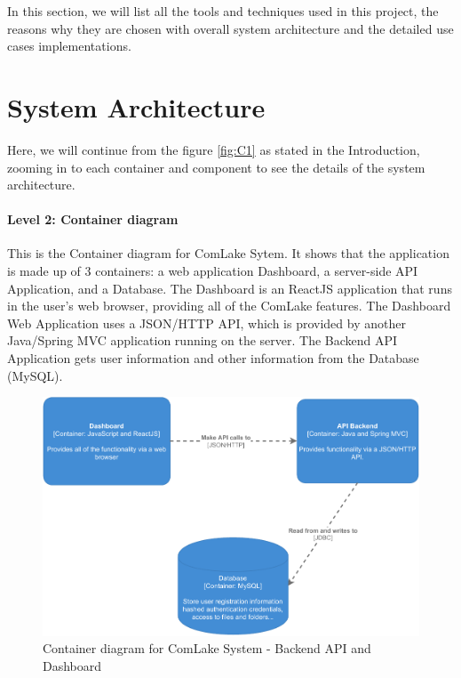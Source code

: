 In this section, we will list all the tools and techniques used in this project, the reasons why they are chosen with overall system architecture and the detailed use cases implementations.

\section{System Architecture}
Here, we will continue from the figure \ref{fig:C1} as stated in the Introduction, zooming in to each container and component to see the details of the system architecture.

\paragraph{Level 2: Container diagram}

This is the Container diagram for ComLake Sytem. It shows that the application is made up of 3 containers: a web application Dashboard, a server-side API Application, and a Database. The Dashboard is an ReactJS application that runs in the user's web browser, providing all of the ComLake features. The Dashboard Web Application uses a JSON/HTTP API, which is provided by another Java/Spring MVC application running on the server. The Backend API Application gets user information and other information from the Database (MySQL).

\begin{figure}[H]
    \centering
    \includegraphics[width=1.0\textwidth]{images/C2.pdf}
    \caption{Container diagram for ComLake System - Backend API and Dashboard}
    \label{fig:C2}
\end{figure}


